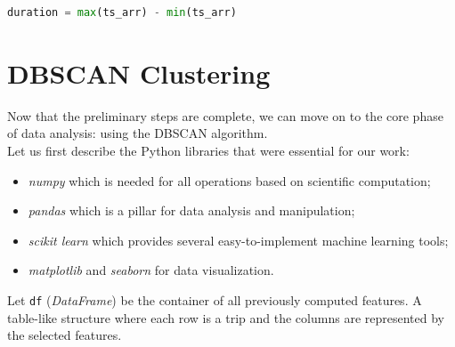     \begin{lstlisting}[language=Python]
duration = max(ts_arr) - min(ts_arr)
    \end{lstlisting}

\clearpage

\clearpage

\section{DBSCAN Clustering}
\label{sec:clustering}

Now that the preliminary steps are complete, we can move on to the core phase of data analysis: \clustering using the DBSCAN algorithm.
\\
Let us first describe the Python libraries that were essential for our work:
\begin{itemize}
\item \textit{numpy} \cite{numpy} which is needed for all operations based on scientific computation;
\item \textit{pandas} \cite{pandas} which is a pillar for data analysis and manipulation;
\item \textit{scikit learn} \cite{sklearn} which provides several easy-to-implement machine learning tools;
\item \textit{matplotlib} \cite{matplotlib} and \textit{seaborn} \cite{seaborn} for data visualization.
\end{itemize}

Let \verb|df| (\textit{DataFrame}) be the container of all previously computed features. A table-like structure where each row is a trip and the columns are represented by the selected features.

